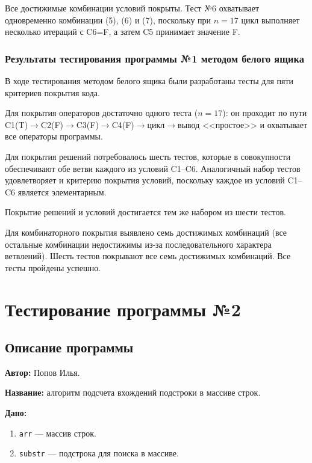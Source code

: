 \documentclass{article}[14pt]
\begin{document}
Все достижимые комбинации условий покрыты. Тест №6 охватывает одновременно комбинации (5), (6) и (7), 
поскольку при $n=17$ цикл выполняет несколько итераций с C6=F, а затем C5 принимает значение F.

\subsubsection{Результаты тестирования программы №1 методом белого ящика}

В ходе тестирования методом белого ящика были разработаны тесты для пяти критериев покрытия кода.

Для покрытия операторов достаточно одного теста ($n = 17$): он проходит по пути
C1(T)$\to$C2(F)$\to$C3(F)$\to$C4(F)$\to$цикл$\to$вывод <<простое>> и охватывает все операторы программы.

Для покрытия решений потребовалось шесть тестов, которые в совокупности обеспечивают обе ветви
каждого из условий C1--C6. Аналогичный набор тестов удовлетворяет и критерию покрытия условий,
поскольку каждое из условий C1--C6 является элементарным.

Покрытие решений и условий достигается тем же набором из шести тестов.

Для комбинаторного покрытия выявлено семь достижимых комбинаций (все остальные комбинации
недостижимы из-за последовательного характера ветвлений). Шесть тестов покрывают все семь
достижимых комбинаций. Все тесты пройдены успешно.

\pagebreak

\section{Тестирование программы №2}

\subsection{Описание программы}

\noindent \textbf{Автор:} Попов Илья.

\noindent \textbf{Название:} алгоритм подсчета вхождений подстроки в массиве строк.

\noindent \textbf{Дано:}

\begin{enumerate}
	\item \texttt{arr} --- массив строк.
	\item \texttt{substr} --- подстрока для поиска в массиве.
\end{enumerate}
\end{document}
